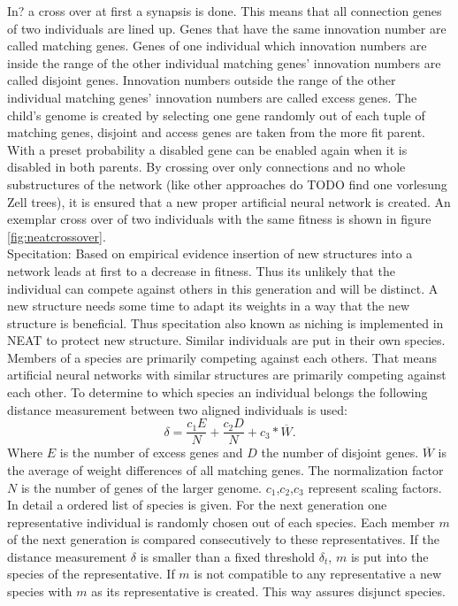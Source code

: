 In? a cross over at first a synapsis is done. This means that all connection genes of two individuals are lined up. Genes that have the same innovation number are called matching genes. Genes of one individual which innovation numbers are inside the range of the other individual matching genes' innovation numbers are called disjoint genes. Innovation numbers outside the range of the other individual matching genes' innovation numbers are called excess genes. The child's genome is created by selecting one gene randomly out of each tuple of matching genes, disjoint and access genes are taken from the more fit parent. With a preset probability a disabled gene can be enabled again when it is disabled in both parents. By crossing over only connections and no whole substructures of the network (like other approaches do  TODO find one vorlesung Zell trees), it is ensured that a new proper artificial neural network is created. 
An exemplar cross over of two individuals with the same fitness is shown in figure \ref{fig:neatcrossover}. \\
Specitation: 
Based on empirical evidence insertion of new structures into a network leads at first to a decrease in fitness. Thus its unlikely that the individual can compete against others in this generation and will be distinct. A new structure needs some time to adapt its weights in a way that the new structure is beneficial. Thus specitation also known as niching is implemented in NEAT to protect new structure. Similar individuals are put in their own species. Members of a species are primarily competing against each others. That means artificial neural networks with similar structures are primarily competing against each other. To determine to which species an individual belongs the following distance measurement between two aligned individuals is used:
\begin{equation*} 
\delta = \dfrac{c_1E}{N}+\dfrac{c_2D}{N}+c_3*\overline{W}.
\end{equation*}
Where $E$ is the number of excess genes and $D$ the number of disjoint genes. $\overline{W}$ is the average of weight differences of all matching genes. The normalization factor $N$ is the number of genes of the larger genome. $c_1$,$c_2$,$c_3$ represent scaling factors. 
In detail a ordered list of species is given. For the next generation one representative individual is randomly chosen out of each species. Each member $m$ of the next generation is compared consecutively to these representatives. If the distance measurement $\delta$ is smaller than a fixed threshold $\delta_t$, $m$ is put into the species of the representative. If $m$ is not compatible to any representative a new species with $m$ as its representative is created. This way assures disjunct species.
